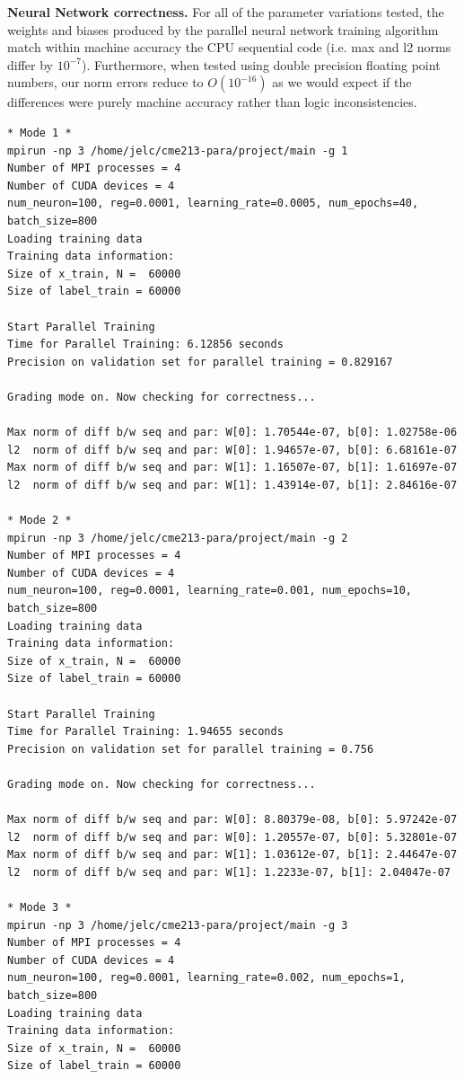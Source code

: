 \documentclass[12pt,letterpaper,twoside]{article}
\begin{document}
\textbf{Neural Network correctness.} For all of the parameter variations tested, the
weights and biases produced by the parallel neural network training algorithm match
within machine accuracy the CPU sequential code (i.e. max and l2 norms differ
by $10^{-7}$). Furthermore, when tested using double precision floating point
numbers, our norm errors reduce to $O(10^{-16})$ as we would expect if the
differences were purely machine accuracy rather than logic inconsistencies.

\begin{verbatim}
* Mode 1 *
mpirun -np 3 /home/jelc/cme213-para/project/main -g 1
Number of MPI processes = 4
Number of CUDA devices = 4
num_neuron=100, reg=0.0001, learning_rate=0.0005, num_epochs=40, batch_size=800
Loading training data
Training data information:
Size of x_train, N =  60000
Size of label_train = 60000

Start Parallel Training
Time for Parallel Training: 6.12856 seconds
Precision on validation set for parallel training = 0.829167

Grading mode on. Now checking for correctness...

Max norm of diff b/w seq and par: W[0]: 1.70544e-07, b[0]: 1.02758e-06
l2  norm of diff b/w seq and par: W[0]: 1.94657e-07, b[0]: 6.68161e-07
Max norm of diff b/w seq and par: W[1]: 1.16507e-07, b[1]: 1.61697e-07
l2  norm of diff b/w seq and par: W[1]: 1.43914e-07, b[1]: 2.84616e-07

* Mode 2 *
mpirun -np 3 /home/jelc/cme213-para/project/main -g 2
Number of MPI processes = 4
Number of CUDA devices = 4
num_neuron=100, reg=0.0001, learning_rate=0.001, num_epochs=10, batch_size=800
Loading training data
Training data information:
Size of x_train, N =  60000
Size of label_train = 60000

Start Parallel Training
Time for Parallel Training: 1.94655 seconds
Precision on validation set for parallel training = 0.756

Grading mode on. Now checking for correctness...

Max norm of diff b/w seq and par: W[0]: 8.80379e-08, b[0]: 5.97242e-07
l2  norm of diff b/w seq and par: W[0]: 1.20557e-07, b[0]: 5.32801e-07
Max norm of diff b/w seq and par: W[1]: 1.03612e-07, b[1]: 2.44647e-07
l2  norm of diff b/w seq and par: W[1]: 1.2233e-07, b[1]: 2.04047e-07

* Mode 3 *
mpirun -np 3 /home/jelc/cme213-para/project/main -g 3
Number of MPI processes = 4
Number of CUDA devices = 4
num_neuron=100, reg=0.0001, learning_rate=0.002, num_epochs=1, batch_size=800
Loading training data
Training data information:
Size of x_train, N =  60000
Size of label_train = 60000


\end{verbatim}
\end{document}
